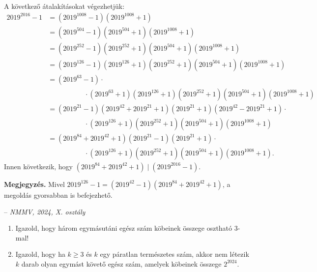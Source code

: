 \begin{solution}
A következő átalakításokat végezhetjük: 
\begin{align*}
2019^{2016}-1 & =(2019^{1008}-1)(2019^{1008}+1)\\
 & =(2019^{504}-1)(2019^{504}+1)(2019^{1008}+1)\\
 & =(2019^{252}-1)(2019^{252}+1)(2019^{504}+1)(2019^{1008}+1)\\
 & =(2019^{126}-1)(2019^{126}+1)(2019^{252}+1)(2019^{504}+1)(2019^{1008}+1)\\
 & =(2019^{63}-1)\cdot\\
 & \phantom{====}\cdot(2019^{63}+1)(2019^{126}+1)(2019^{252}+1)(2019^{504}+1)(2019^{1008}+1)\\
 & =(2019^{21}-1)(2019^{42}+2019^{21}+1)(2019^{21}+1)(2019^{42}-2019^{21}+1)\cdot\\
 & \phantom{====}\cdot(2019^{126}+1)(2019^{252}+1)(2019^{504}+1)(2019^{1008}+1)\\
 & =(2019^{84}+2019^{42}+1)(2019^{21}-1)(2019^{21}+1)\cdot\\
 & \phantom{====}\cdot(2019^{126}+1)(2019^{252}+1)(2019^{504}+1)(2019^{1008}+1).
\end{align*}
Innen következik, hogy $(2019^{84}+2019^{42}+1)\mid(2019^{2016}-1)$. 
\end{solution}
\textbf{Megjegyzés.} Mivel $2019^{126}-1=(2019^{42}-1)(2019^{84}+2019^{42}+1)$,
a megoldás gyorsabban is befejezhető. 
\begin{extraproblem} -- \emph{NMMV, 2024, X. osztály} 
\begin{enumerate}
\item Igazold, hogy három egymásutáni egész szám köbeinek összege osztható
$3$-mal!
\item Igazold, hogy ha $k\ge3$ és $k$ egy páratlan természetes szám, akkor
nem létezik $k$ darab olyan egymást követő egész szám, amelyek köbeinek
összege $2^{2024}$.
\end{enumerate}
\end{extraproblem}

